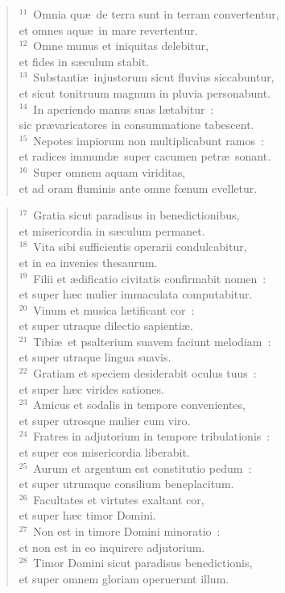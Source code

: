 \begin{verse}${}^{11}$~Omnia qu\ae\ de terra sunt in terram convertentur,\\ et omnes aqu\ae\ in mare revertentur.\\
${}^{12}$~Omne munus et iniquitas delebitur,\\ et fides in s\ae culum stabit.\\
${}^{13}$~Substanti\ae\ injustorum sicut fluvius siccabuntur,\\ et sicut tonitruum magnum in pluvia personabunt.\\
${}^{14}$~In aperiendo manus suas l\ae tabitur~:\\ sic pr\ae varicatores in consummatione tabescent.\\
${}^{15}$~Nepotes impiorum non multiplicabunt ramos~:\\ et radices immund\ae\ super cacumen petr\ae\ sonant.\\
${}^{16}$~Super omnem aquam viriditas,\\ et ad oram fluminis ante omne fœnum evelletur.\end{verse}


\begin{verse}${}^{17}$~Gratia sicut paradisus in benedictionibus,\\ et misericordia in s\ae culum permanet.\\
${}^{18}$~Vita sibi sufficientis operarii condulcabitur,\\ et in ea invenies thesaurum.\\
${}^{19}$~Filii et \ae dificatio civitatis confirmabit nomen~:\\ et super h\ae c mulier immaculata computabitur.\\
${}^{20}$~Vinum et musica l\ae tificant cor~:\\ et super utraque dilectio sapienti\ae .\\
${}^{21}$~Tibi\ae\ et psalterium suavem faciunt melodiam~:\\ et super utraque lingua suavis.\\
${}^{22}$~Gratiam et speciem desiderabit oculus tuus~:\\ et super h\ae c virides sationes.\\
${}^{23}$~Amicus et sodalis in tempore convenientes,\\ et super utrosque mulier cum viro.\\
${}^{24}$~Fratres in adjutorium in tempore tribulationis~:\\ et super eos misericordia liberabit.\\
${}^{25}$~Aurum et argentum est constitutio pedum~:\\ et super utrumque consilium beneplacitum.\\
${}^{26}$~Facultates et virtutes exaltant cor,\\ et super h\ae c timor Domini.\\
${}^{27}$~Non est in timore Domini minoratio~:\\ et non est in eo inquirere adjutorium.\\
${}^{28}$~Timor Domini sicut paradisus benedictionis,\\ et super omnem gloriam operuerunt illum.\end{verse}



